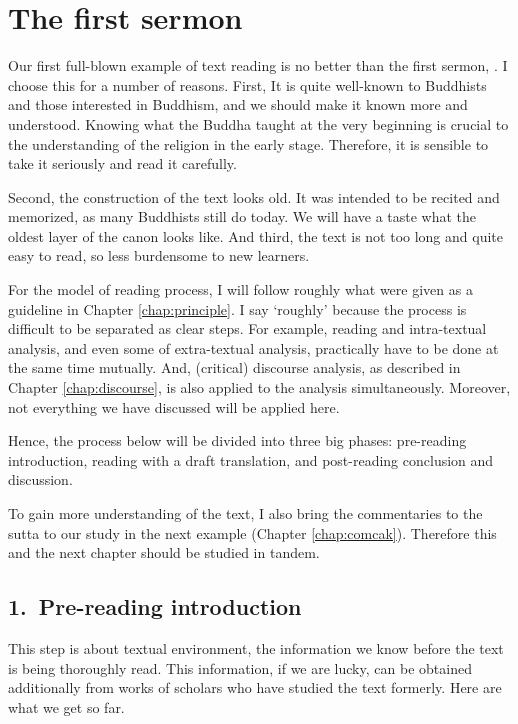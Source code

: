 \chapter{The first sermon}\label{chap:dhammacak}

Our first full-blown example of text reading is no better than the first sermon, . I choose this for a number of reasons. First, It is quite well-known to Buddhists and those interested in Buddhism, and we should make it known more and understood. Knowing what the Buddha taught at the very beginning is crucial to the understanding of the religion in the early stage. Therefore, it is sensible to take it seriously and read it carefully.

Second, the construction of the text looks old. It was intended to be recited and memorized, as many Buddhists still do today. We will have a taste what the oldest layer of the canon looks like. And third, the text is not too long and quite easy to read, so less burdensome to new learners.

For the model of reading process, I will follow roughly what were given as a guideline in Chapter \ref{chap:principle}. I say `roughly' because the process is difficult to be separated as clear steps. For example, reading and intra-textual analysis, and even some of extra-textual analysis, practically have to be done at the same time mutually. And, (critical) discourse analysis, as described in Chapter \ref{chap:discourse}, is also applied to the analysis simultaneously. Moreover, not everything we have discussed will be applied here.

Hence, the process below will be divided into three big phases: pre-reading introduction, reading with a draft translation, and post-reading conclusion and discussion.

To gain more understanding of the text, I also bring the commentaries to the sutta to our study in the next example (Chapter \ref{chap:comcak}). Therefore this and the next chapter should be studied in tandem.

{}
\section*{1.\ Pre-reading introduction}

This step is about textual environment, the information we know before the text is being thoroughly read. This information, if we are lucky, can be obtained additionally from works of scholars who have studied the text formerly. Here are what we get so far.

